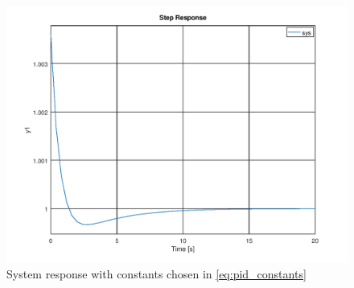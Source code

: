 \documentclass[a4paper, 12pt]{article}
\begin{document}
\begin{figure}[H]
	\centering
	\includegraphics[width=\textwidth]{response.png}
	\caption{System response with constants chosen in \eqref{eq:pid_constants}}
	\label{fig:response}
\end{figure}
\end{document}
